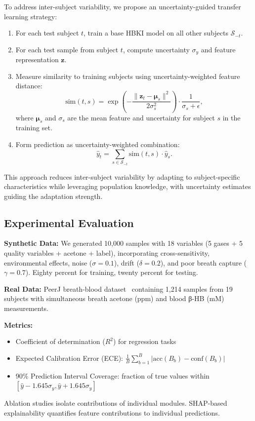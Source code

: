 \documentclass{ieeeaccess}
\begin{document}
To address inter-subject variability, we propose an uncertainty-guided transfer learning strategy:
\begin{enumerate}
\item For each test subject $t$, train a base HBKI model on all other subjects $\mathcal{S}_{-t}$.
\item For each test sample from subject $t$, compute uncertainty $\sigma_y$ and feature representation $\mathbf{z}$.
\item Measure similarity to training subjects using uncertainty-weighted feature distance:
\begin{equation}
\text{sim}(t, s) = \exp\left(-\frac{\|\mathbf{z}_t - \boldsymbol{\mu}_s\|^2}{2 \sigma_s^2}\right) \cdot \frac{1}{\sigma_s + \epsilon},
\end{equation}
where $\boldsymbol{\mu}_s$ and $\sigma_s$ are the mean feature and uncertainty for subject $s$ in the training set.
\item Form prediction as uncertainty-weighted combination:
\begin{equation}
\hat{y}_t = \sum_{s \in \mathcal{S}_{-t}} \text{sim}(t, s) \cdot \hat{y}_s.
\end{equation}
\end{enumerate}
This approach reduces inter-subject variability by adapting to subject-specific characteristics while leveraging population knowledge, with uncertainty estimates guiding the adaptation strength.

\subsection{Experimental Evaluation}

\textbf{Synthetic Data:} We generated 10,000 samples with 18 variables (5 gases + 5 quality variables + acetone + label), incorporating cross-sensitivity, environmental effects, noise ($\sigma=0.1$), drift ($\delta=0.2$), and poor breath capture ($\gamma=0.7$). Eighty percent for training, twenty percent for testing.

\textbf{Real Data:} PeerJ breath-blood dataset~\cite{peerj2015} containing 1,214 samples from 19 subjects with simultaneous breath acetone (ppm) and blood β-HB (mM) measurements.

\textbf{Metrics:}
\begin{itemize}
\item Coefficient of determination ($R^2$) for regression tasks
\item Expected Calibration Error (ECE): $\frac{1}{B} \sum_{b=1}^{B} |\text{acc}(B_b) - \text{conf}(B_b)|$
\item 90\% Prediction Interval Coverage: fraction of true values within $[\hat{y} - 1.645\sigma_y, \hat{y} + 1.645\sigma_y]$
\end{itemize}
Ablation studies isolate contributions of individual modules. SHAP-based explainability quantifies feature contributions to individual predictions.
\end{document}
